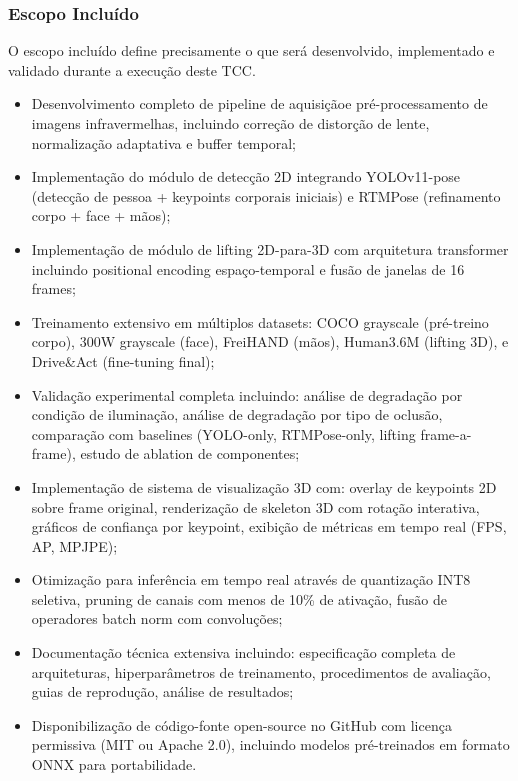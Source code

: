\documentclass[12pt, a4paper]{article}
\begin{document}
\subsubsection{Escopo Incluído}

O escopo incluído define precisamente o que será desenvolvido, implementado e validado durante a execução deste TCC.

\begin{itemize}
    \item Desenvolvimento completo de pipeline de aquisiçãoe pré-processamento de imagens infravermelhas, incluindo correção de distorção de lente, normalização adaptativa e buffer temporal;
    
    \item Implementação do módulo de detecção 2D integrando YOLOv11-pose (detecção de pessoa + keypoints corporais iniciais) e RTMPose (refinamento corpo + face + mãos);
    
    \item Implementação de módulo de lifting 2D-para-3D com arquitetura transformer incluindo positional encoding espaço-temporal e fusão de janelas de 16 frames;
    
    \item Treinamento extensivo em múltiplos datasets: COCO grayscale (pré-treino corpo), 300W grayscale (face), FreiHAND (mãos), Human3.6M (lifting 3D), e Drive\&Act (fine-tuning final);
    
    \item Validação experimental completa incluindo: análise de degradação por condição de iluminação, análise de degradação por tipo de oclusão, comparação com baselines (YOLO-only, RTMPose-only, lifting frame-a-frame), estudo de ablation de componentes;
    
    \item Implementação de sistema de visualização 3D com: overlay de keypoints 2D sobre frame original, renderização de skeleton 3D com rotação interativa, gráficos de confiança por keypoint, exibição de métricas em tempo real (FPS, AP, MPJPE);
    
    \item Otimização para inferência em tempo real através de quantização INT8 seletiva, pruning de canais com menos de 10\% de ativação, fusão de operadores batch norm com convoluções;
    
    \item Documentação técnica extensiva incluindo: especificação completa de arquiteturas, hiperparâmetros de treinamento, procedimentos de avaliação, guias de reprodução, análise de resultados;
    
    \item Disponibilização de código-fonte open-source no GitHub com licença permissiva (MIT ou Apache 2.0), incluindo modelos pré-treinados em formato ONNX para portabilidade.
\end{itemize}
\end{document}
